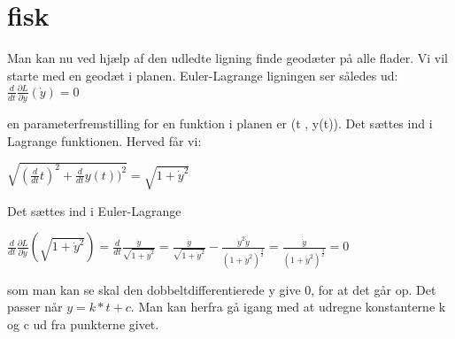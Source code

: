 \section{fisk}
Man kan nu ved hjælp af den udledte ligning finde geodæter på alle flader. Vi vil starte med en geodæt i planen. Euler-Lagrange ligningen ser således ud:
$\frac{d}{dt} \frac{\partial L}{\partial \dot{y}}(\dot{y})=0$

en parameterfremstilling for en funktion i planen er (t , y(t)). Det sættes ind i Lagrange funktionen. Herved får vi:

$\sqrt{(\frac{d}{dt}t)^2+\frac{d}{dt}y(t))^2}=\sqrt{1+\dot{y}^2}$

Det sættes ind i Euler-Lagrange

$\frac{d}{dt} \frac{\partial L}{\partial \dot{y}}(\sqrt{1+\dot{y}^2})=\frac{d}{dt} \frac{\dot{y}}{\sqrt{1+\dot{y}^2}} = \frac{\dot{\dot{y}}}{\sqrt{1+\dot{y}^2}}-\frac{\dot{y}^2\dot{\dot{y}}}{(1+\dot{y}^2)^\frac{3}{2}}=\frac{\dot{\dot{y}}}{(1+\dot{y}^2)^\frac{3}{2}}=0$

som man kan se skal den dobbeltdifferentierede y give 0, for at det går op. Det passer når $y=k*t+c$. Man kan herfra gå igang med at udregne konstanterne k og c ud fra punkterne givet.